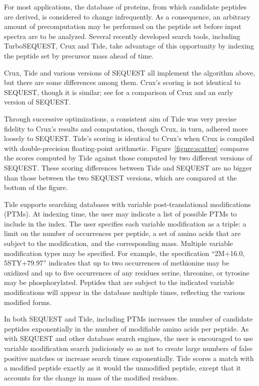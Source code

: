 For most applications, the database of proteins, from which candidate
peptides are derived, is considered to change infrequently. As a
consequence, an arbitrary amount of precomputation may be performed on
the peptide set before input spectra are to be analyzed.  Several
recently developed search tools, including TurboSEQUEST, Crux and
Tide, take advantage of this opportunity by indexing the peptide set
by precursor mass ahead of time.

Crux, Tide and various versions of SEQUEST all implement the
algorithm above, but there are some differences among them. Crux's
scoring is not identical to SEQUEST, though it is similar; see
\cite{park:rapid} for a comparison of Crux and an early version of
SEQUEST.

Through successive optimizations, a consistent aim of Tide was very
precise fidelity to Crux's results and \XCorr computation, though
Crux, in turn, adhered more loosely to SEQUEST. Tide's scoring is
identical to Crux's when Crux is compiled with double-precision
floating-point arithmetic. Figure~\ref{figure:scatter} compares
the \XCorr scores computed by Tide against those computed by two
different versions of SEQUEST. These scoring differences between Tide
and SEQUEST are no bigger than those between the two SEQUEST versions,
which are compared at the bottom of the figure.


Tide supports searching databases with variable post-translational
modifications (PTMs). At indexing time, the user may indicate a list
of possible PTMs to include in the index. The user specifies each
variable modification as a triple: a limit on the number of
occurrences per peptide, a set of amino acids that are subject to the
modification, and the corresponding mass.  Multiple variable
modification types may be specified. For example, the specification
``2M+16.0, 5STY+79.97'' indicates that up to two occurrences of
methionine may be oxidized and up to five occurrences of any residues
serine, threonine, or tyrosine may be phosphorylated. Peptides that
are subject to the indicated variable modifications will appear in the
database multiple times, reflecting the various modified forms.

In both SEQUEST and Tide, including PTMs increases the number of
candidate peptides exponentially in the number of modifiable amino
acids per peptide.  As with SEQUEST and other database search engines,
the user is encouraged to use variable modification search judiciously
so as not to create large numbers of false positive matches or
increase search times exponentially. Tide scores a match with a
modified peptide exactly as it would the unmodified peptide, except
that it accounts for the change in mass of the modified residues.

